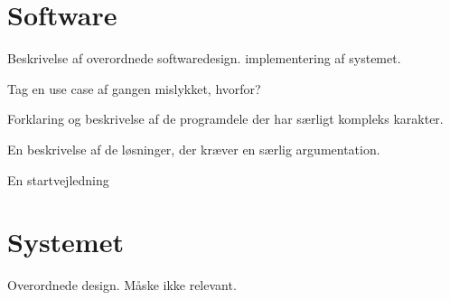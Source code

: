 \section{Software}
Beskrivelse af overordnede softwaredesign.
implementering af systemet. 

Tag en use case af gangen
mislykket, hvorfor?

Forklaring og beskrivelse af de programdele der har særligt kompleks karakter.

En beskrivelse af de løsninger, der kræver en særlig argumentation.

En startvejledning 


\section{Systemet}
Overordnede design.
Måske ikke relevant.
